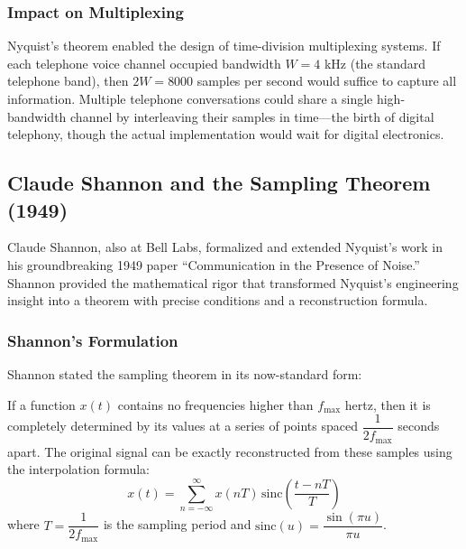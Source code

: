 \subsubsection{Impact on Multiplexing}

Nyquist's theorem enabled the design of time-division multiplexing systems. If each telephone voice channel occupied bandwidth $W = 4$ kHz (the standard telephone band), then $2W = 8000$ samples per second would suffice to capture all information. Multiple telephone conversations could share a single high-bandwidth channel by interleaving their samples in time---the birth of digital telephony, though the actual implementation would wait for digital electronics.

\subsection{Claude Shannon and the Sampling Theorem (1949)}
\label{subsec:shannon}

Claude Shannon, also at Bell Labs, formalized and extended Nyquist's work in his groundbreaking 1949 paper ``Communication in the Presence of Noise.'' Shannon provided the mathematical rigor that transformed Nyquist's engineering insight into a theorem with precise conditions and a reconstruction formula.

\subsubsection{Shannon's Formulation}

Shannon stated the sampling theorem in its now-standard form:

\begin{tcolorbox}[colback=green!5!white,colframe=green!75!black,sharp corners,title=Nyquist-Shannon Sampling Theorem]
If a function $x(t)$ contains no frequencies higher than $f_{\max}$ hertz, then it is completely determined by its values at a series of points spaced $\dfrac{1}{2f_{\max}}$ seconds apart. The original signal can be exactly reconstructed from these samples using the interpolation formula:
\begin{equation}
x(t) = \sum_{n=-\infty}^{\infty} x(nT) \, \mathrm{sinc}\left(\frac{t - nT}{T}\right)
\label{eq:shannon_reconstruction}
\end{equation}
where $T = \dfrac{1}{2f_{\max}}$ is the sampling period and $\mathrm{sinc}(u) = \dfrac{\sin(\pi u)}{\pi u}$.
\end{tcolorbox}

